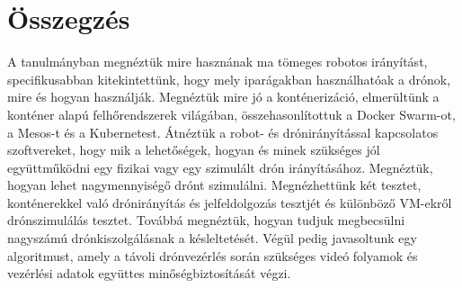 \chapter*{Összegzés}
A tanulmányban megnéztük mire hasznának ma tömeges robotos irányítást, specifikusabban kitekintettünk, hogy mely iparágakban használhatóak a drónok, mire és hogyan használják. Megnéztük mire jó a konténerizáció, elmerültünk a konténer alapú felhőrendszerek világában, összehasonlítottuk a Docker Swarm-ot, a Mesos-t és a Kubernetest. Átnéztük a robot- és drónirányítással kapcsolatos szoftvereket, hogy mik a lehetőségek, hogyan és minek szükséges jól együttműködni egy fizikai vagy egy szimulált drón irányításához. Megnéztük, hogyan lehet nagymennyiségő drónt szimulálni. Megnézhettünk két tesztet, konténerekkel való drónirányítás és jelfeldolgozás tesztjét és különböző VM-ekről drónszimulálás tesztet. Továbbá megnéztük, hogyan tudjuk megbecsülni nagyszámú drónkiszolgálásnak a késleltetését. Végül pedig javasoltunk egy algoritmust, amely a távoli drónvezérlés során szükséges videó folyamok és vezérlési adatok együttes minőségbiztosítását végzi.